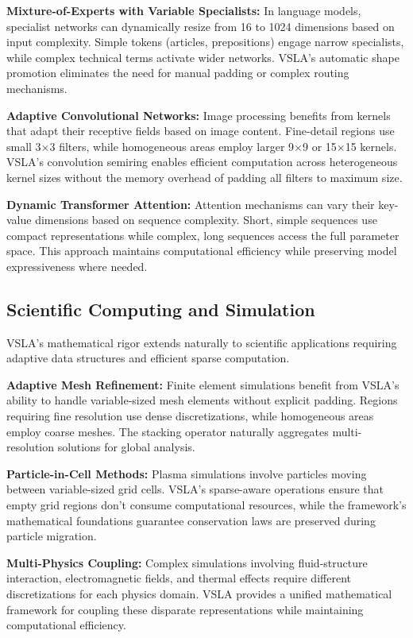 \textbf{Mixture-of-Experts with Variable Specialists:} In language models, specialist networks can dynamically resize from 16 to 1024 dimensions based on input complexity. Simple tokens (articles, prepositions) engage narrow specialists, while complex technical terms activate wider networks. VSLA's automatic shape promotion eliminates the need for manual padding or complex routing mechanisms.

\textbf{Adaptive Convolutional Networks:} Image processing benefits from kernels that adapt their receptive fields based on image content. Fine-detail regions use small 3×3 filters, while homogeneous areas employ larger 9×9 or 15×15 kernels. VSLA's convolution semiring enables efficient computation across heterogeneous kernel sizes without the memory overhead of padding all filters to maximum size.

\textbf{Dynamic Transformer Attention:} Attention mechanisms can vary their key-value dimensions based on sequence complexity. Short, simple sequences use compact representations while complex, long sequences access the full parameter space. This approach maintains computational efficiency while preserving model expressiveness where needed.

\subsection{Scientific Computing and Simulation}

VSLA's mathematical rigor extends naturally to scientific applications requiring adaptive data structures and efficient sparse computation.

\textbf{Adaptive Mesh Refinement:} Finite element simulations benefit from VSLA's ability to handle variable-sized mesh elements without explicit padding. Regions requiring fine resolution use dense discretizations, while homogeneous areas employ coarse meshes. The stacking operator naturally aggregates multi-resolution solutions for global analysis.

\textbf{Particle-in-Cell Methods:} Plasma simulations involve particles moving between variable-sized grid cells. VSLA's sparse-aware operations ensure that empty grid regions don't consume computational resources, while the framework's mathematical foundations guarantee conservation laws are preserved during particle migration.

\textbf{Multi-Physics Coupling:} Complex simulations involving fluid-structure interaction, electromagnetic fields, and thermal effects require different discretizations for each physics domain. VSLA provides a unified mathematical framework for coupling these disparate representations while maintaining computational efficiency.
